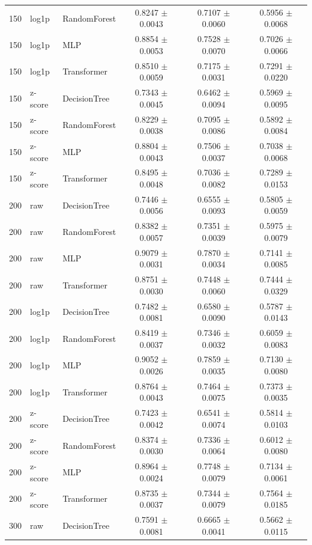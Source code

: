 \begin{longtable}{rllccc}
150 & log1p & RandomForest & 0.8247 $\pm$ 0.0043 & 0.7107 $\pm$ 0.0060 & 0.5956 $\pm$ 0.0068 \\
150 & log1p & MLP & 0.8854 $\pm$ 0.0053 & 0.7528 $\pm$ 0.0070 & 0.7026 $\pm$ 0.0066 \\
150 & log1p & Transformer & 0.8510 $\pm$ 0.0059 & 0.7175 $\pm$ 0.0031 & 0.7291 $\pm$ 0.0220 \\
150 & z-score & DecisionTree & 0.7343 $\pm$ 0.0045 & 0.6462 $\pm$ 0.0094 & 0.5969 $\pm$ 0.0095 \\
150 & z-score & RandomForest & 0.8229 $\pm$ 0.0038 & 0.7095 $\pm$ 0.0086 & 0.5892 $\pm$ 0.0084 \\
150 & z-score & MLP & 0.8804 $\pm$ 0.0043 & 0.7506 $\pm$ 0.0037 & 0.7038 $\pm$ 0.0068 \\
150 & z-score & Transformer & 0.8495 $\pm$ 0.0048 & 0.7036 $\pm$ 0.0082 & 0.7289 $\pm$ 0.0153 \\
200 & raw & DecisionTree & 0.7446 $\pm$ 0.0056 & 0.6555 $\pm$ 0.0093 & 0.5805 $\pm$ 0.0059 \\
200 & raw & RandomForest & 0.8382 $\pm$ 0.0057 & 0.7351 $\pm$ 0.0039 & 0.5975 $\pm$ 0.0079 \\
200 & raw & MLP & 0.9079 $\pm$ 0.0031 & 0.7870 $\pm$ 0.0034 & 0.7141 $\pm$ 0.0085 \\
200 & raw & Transformer & 0.8751 $\pm$ 0.0030 & 0.7448 $\pm$ 0.0060 & 0.7444 $\pm$ 0.0329 \\
200 & log1p & DecisionTree & 0.7482 $\pm$ 0.0081 & 0.6580 $\pm$ 0.0090 & 0.5787 $\pm$ 0.0143 \\
200 & log1p & RandomForest & 0.8419 $\pm$ 0.0037 & 0.7346 $\pm$ 0.0032 & 0.6059 $\pm$ 0.0083 \\
200 & log1p & MLP & 0.9052 $\pm$ 0.0026 & 0.7859 $\pm$ 0.0035 & 0.7130 $\pm$ 0.0080 \\
200 & log1p & Transformer & 0.8764 $\pm$ 0.0043 & 0.7464 $\pm$ 0.0075 & 0.7373 $\pm$ 0.0035 \\
200 & z-score & DecisionTree & 0.7423 $\pm$ 0.0042 & 0.6541 $\pm$ 0.0074 & 0.5814 $\pm$ 0.0103 \\
200 & z-score & RandomForest & 0.8374 $\pm$ 0.0030 & 0.7336 $\pm$ 0.0064 & 0.6012 $\pm$ 0.0080 \\
200 & z-score & MLP & 0.8964 $\pm$ 0.0024 & 0.7748 $\pm$ 0.0079 & 0.7134 $\pm$ 0.0061 \\
200 & z-score & Transformer & 0.8735 $\pm$ 0.0037 & 0.7344 $\pm$ 0.0079 & 0.7564 $\pm$ 0.0185 \\
300 & raw & DecisionTree & 0.7591 $\pm$ 0.0081 & 0.6665 $\pm$ 0.0041 & 0.5662 $\pm$ 0.0115 \\

\end{longtable}
